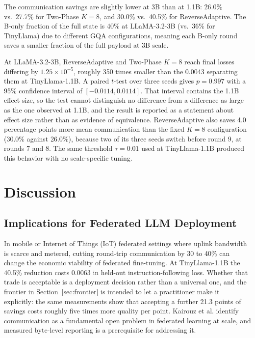 The communication savings are slightly lower at 3B than at 1.1B: 26.0\% vs.\ 27.7\% for Two-Phase $K{=}8$, and 30.0\% vs.\ 40.5\% for ReverseAdaptive. The B-only fraction of the full state is 40\% at LLaMA-3.2-3B (vs.\ 36\% for TinyLlama) due to different GQA configurations, meaning each B-only round saves a smaller fraction of the full payload at 3B scale.

At LLaMA-3.2-3B, ReverseAdaptive and Two-Phase $K{=}8$ reach final losses differing by $1.25 \times 10^{-5}$, roughly 350 times smaller than the 0.0043 separating them at TinyLlama-1.1B. A paired $t$-test over three seeds gives $p = 0.997$ with a 95\% confidence interval of $[{-}0.0114, 0.0114]$. That interval contains the 1.1B effect size, so the test cannot distinguish no difference from a difference as large as the one observed at 1.1B, and the result is reported as a statement about effect size rather than as evidence of equivalence. ReverseAdaptive also saves 4.0 percentage points more mean communication than the fixed $K{=}8$ configuration (30.0\% against 26.0\%), because two of its three seeds switch before round 9, at rounds 7 and 8. The same threshold $\tau{=}0.01$ used at TinyLlama-1.1B produced this behavior with no scale-specific tuning.



\section{Discussion}
\label{sec:discussion}

\subsection{Implications for Federated LLM Deployment}
In mobile or Internet of Things (IoT) federated settings where uplink bandwidth is scarce and metered, cutting round-trip communication by 30 to 40\% can change the economic viability of federated fine-tuning. At TinyLlama-1.1B the 40.5\% reduction costs 0.0063 in held-out instruction-following loss. Whether that trade is acceptable is a deployment decision rather than a universal one, and the frontier in Section~\ref{sec:frontier} is intended to let a practitioner make it explicitly: the same measurements show that accepting a further 21.3 points of savings costs roughly five times more quality per point. Kairouz et al. \cite{kairouz2021advances} identify communication as a fundamental open problem in federated learning at scale, and measured byte-level reporting is a prerequisite for addressing it.

